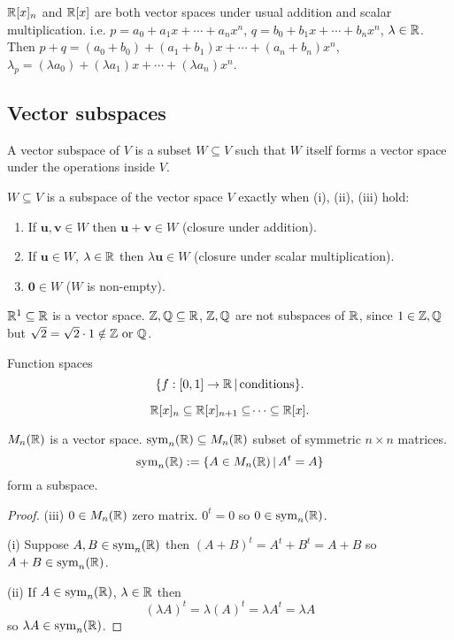 \documentclass[10pt, a4paper]{article}
\newcommand{\mbf}[1]{\mathbf{#1}}
\begin{document}
$\mathbb{R}[x]_n$ and $\mathbb{R}[x]$ are both vector spaces under usual addition and scalar multiplication.
i.e. $p = a_0 + a_1x + \dotsi + a_nx ^ n$, $q = b_0 + b_1x + \dotsi + b_nx ^ n$, $\lambda \in \mathbb{R}$.
Then $p + q = (a_0 + b_0) + (a_1 + b_1)x + \dotsi + (a_n + b_n)x ^ n$,
$\lambda_p = (\lambda a_0) + (\lambda a_1)x + \dotsi + (\lambda a_n)x ^ n$.

\subsection{Vector subspaces}
\begin{definition}
    A vector subspace of $V$ is a subset $W \subseteq V$ such that $W$ itself forms a vector space under the operations inside $V$.
\end{definition}

\begin{lemma}
    $W \subseteq V$ is a subspace of the vector space $V$ exactly when (i), (ii), (iii) hold:
    \begin{enumerate}[label = (\roman*)]
        \item If $\mbf{u, v} \in W$ then $\mbf{u + v} \in W$
        (closure under addition).
        \item If $\mbf{u} \in W$, $\lambda \in \mathbb{R}$ then $\lambda\mbf{u} \in W$
        (closure under scalar multiplication).
        \item $\mbf{0} \in W$
        ($W$ is non-empty).
    \end{enumerate}
\end{lemma}

$\mathbb{R} ^ 1 \subseteq \mathbb{R}$ is a vector space. $\mathbb{Z}, \mathbb{Q} \subseteq \mathbb{R}$,
$\mathbb{Z}, \mathbb{Q}$ are not subspaces of $\mathbb{R}$,
since $1 \in \mathbb{Z}, \mathbb{Q}$ but $\sqrt{2} = \sqrt{2} \cdot 1 \notin \mathbb{Z} \text{ or } \mathbb{Q}$.

\begin{example}
    Function spaces
    \[
    \{f : [0, 1] \rightarrow \mathbb{R}\,|\,\text{conditions}\}.
    \]
\end{example}
\begin{example}
    \[
    \mathbb{R}[x]_n \subseteq \mathbb{R}[x]_{n + 1} \subseteq \dotsi \subseteq \mathbb{R}[x].
    \]
\end{example}

\begin{example}
    $M_n(\mathbb{R})$ is a vector space.
    $\mathrm{sym}_n(\mathbb{R}) \subseteq M_n(\mathbb{R})$ subset of symmetric $n \times n$ matrices.
    \[
    \mathrm{sym}_n(\mathbb{R}) := \{A \in M_n(\mathbb{R})\,|\, A ^ t = A\}
    \]
    form a subspace.
    \begin{proof}
        (iii) $0 \in M_n(\mathbb{R})$ zero matrix.
        $0 ^ t = 0$ so $0 \in \mathrm{sym}_n(\mathbb{R})$.

        (i) Suppose $A, B \in \mathrm{sym}_n(\mathbb{R})$ then $(A + B) ^ t = A ^ t + B ^ t = A + B$ so $A + B \in \mathrm{sym}_n(\mathbb{R})$.

        (ii) If $A \in \mathrm{sym}_n(\mathbb{R})$,
        $\lambda \in \mathbb{R}$ then
        \[
        (\lambda A) ^ t = \lambda(A) ^ t = \lambda A ^ t = \lambda A
        \]
        so $\lambda A \in \mathrm{sym}_n(\mathbb{R})$.
        \end{proof}
\end{example}
\end{document}
